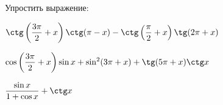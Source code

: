 \begin{class}[number=6]
\begin{listofex}
		\item Упростить выражение:
		\begin{enumcols}[itemcolumns=1]
			\item \( \ctg\left( \dfrac{3\pi}{2}+x \right)\ctg(\pi-x)-\ctg\left( \dfrac{\pi}{2}+x \right)\tg(2\pi+x) \)
			\item \( \cos\left( \dfrac{3\pi}{2}+x \right)\sin x + \sin^2(3\pi+x)+\tg(5\pi+x)\ctg x \)
			\item \( \dfrac{\sin x}{1+\cos x}+\ctg x \)
		\end{enumcols}
		\item {}
		\item {}
	\end{listofex}
\end{class}
%
%
%
%	
%
%
%	
%
%
%	
